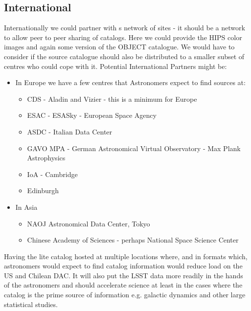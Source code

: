 \subsection {International}
Internationally we could partner with s network of sites - it should be a network to allow peer to peer sharing of catalogs. Here we could provide the HIPS color images and again some version of the OBJECT catalogue. We would have to consider if the source catalogue should also be distributed to a smaller subset of centres who could cope with it.
Potential International Partners might be:

\begin{itemize}
\item In Europe we have a few centres that Astronomers expect to find sources at:
\begin{itemize}
    \item CDS  - Aladin and Vizier - this is a minimum for Europe
    \item ESAC - ESASky - European Space Agency
    \item  ASDC - Italian Data Center
    \item  GAVO MPA - German Astronomical Virtual Observatory - Max Plank Astrophysics
    \item  IoA - Cambridge
    \item  Edinburgh
\end{itemize}
\item In Asia
\begin{itemize}
    \item  NAOJ Astronomical Data Center, Tokyo
    \item  Chinese Academy of Sciences - perhaps National Space Science Center
\end{itemize}
\end{itemize}


Having the lite catalog hosted at multiple locations where, and in formats which, astronomers would expect to find catalog information would reduce load on the US and Chilean DAC.
 It will also put the LSST data more readily in the hands of the astronomers and should accelerate science at least in the cases where the catalog is the prime source of information e.g. galactic dynamics and other large statistical studies.

